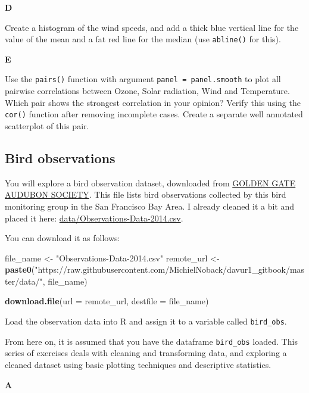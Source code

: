 \documentclass[]{book}
\newenvironment{Shaded}{\begin{snugshade}}{\end{snugshade}}
\newcommand{\DataTypeTok}[1]{\textcolor[rgb]{0.13,0.29,0.53}{#1}}
\newcommand{\KeywordTok}[1]{\textcolor[rgb]{0.13,0.29,0.53}{\textbf{#1}}}
\newcommand{\NormalTok}[1]{#1}
\newcommand{\StringTok}[1]{\textcolor[rgb]{0.31,0.60,0.02}{#1}}
\begin{document}
\textbf{D}

Create a histogram of the wind speeds, and add a thick blue vertical line for the value of the mean and a fat red line for the median (use \texttt{abline()} for this).

\textbf{E}

Use the \texttt{pairs()} function with argument \texttt{panel\ =\ panel.smooth} to plot all pairwise correlations between Ozone, Solar radiation, Wind and Temperature. Which pair shows the strongest correlation in your opinion? Verify this using the \texttt{cor()} function after removing incomplete cases. Create a separate well annotated scatterplot of this pair.

\hypertarget{bird-observations}{%
\subsection{Bird observations}\label{bird-observations}}

You will explore a bird observation dataset, downloaded from \href{http://goldengateaudubon.org/birding-resources/observations/}{GOLDEN GATE AUDUBON SOCIETY}. This file lists bird observations collected by this bird monitoring group in the San Francisco Bay Area. I already cleaned it a bit and placed it here: \url{data/Observations-Data-2014.csv}.

You can download it as follows:

\begin{Shaded}
\begin{Highlighting}[]
\NormalTok{file_name <-}\StringTok{ "Observations-Data-2014.csv"}
\NormalTok{remote_url <-}\StringTok{ }\KeywordTok{paste0}\NormalTok{(}\StringTok{"https://raw.githubusercontent.com/MichielNoback/davur1_gitbook/master/data/"}\NormalTok{, file_name)}

\KeywordTok{download.file}\NormalTok{(}\DataTypeTok{url =}\NormalTok{ remote_url, }\DataTypeTok{destfile =}\NormalTok{ file_name)}
\end{Highlighting}
\end{Shaded}

Load the observation data into R and assign it to a variable called \texttt{bird\_obs}.

From here on, it is assumed that you have the dataframe \texttt{bird\_obs} loaded. This series of exercises deals with cleaning and transforming data, and exploring a cleaned dataset using basic plotting techniques and descriptive statistics.

\textbf{A}
\end{document}
